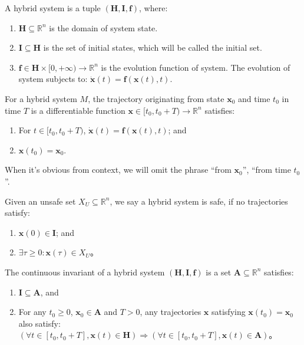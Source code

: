 \documentclass{jssc}
\begin{document}
\begin{definition}
A hybrid system is a tuple $(\boldsymbol{H}, \boldsymbol{I}, \boldsymbol{f})$,  where:
	\begin{enumerate}
		\item $\boldsymbol{H} \subseteq \mathbb{R}^n$  is the domain of system state.
		\item $\boldsymbol{I} \subseteq \boldsymbol{H}$ is the set of initial states, which will be called the initial set.
		\item $\boldsymbol{f} \in \boldsymbol{H} \times [0, +\infty) \rightarrow \mathbb{R}^n$ is the evolution function of system. The evolution of system subjects to: $\dot{\boldsymbol{x}}(t) = \boldsymbol{f}(\boldsymbol{x}(t),t)$.
	\end{enumerate}
\end{definition}

\begin{definition}[Trajectory]
For a hybrid system $M$, the trajectory originating from state $\boldsymbol{x}_0$ and time $t_0$ in time $T$ is a differentiable function $\boldsymbol{x} \in [t_0, t_0 + T) \rightarrow \mathbb{R}^n$ satisfies:
	\begin{enumerate}
		\item For $t \in [t_0, t_0 + T)$, $\dot{\boldsymbol{x}}(t) = \boldsymbol{f}(\boldsymbol{x}(t),t)$; and
		\item $\boldsymbol{x}(t_0) = \boldsymbol{x}_0$.
	\end{enumerate}
	
When it's obvious from context, we will omit the phrase ``from $\boldsymbol{x}_0$'', ``from time $t_0$''.
\end{definition}

\begin{definition}[Safety]
Given an unsafe set $X_U \subseteq \mathbb{R}^n$,  we say a hybrid system is safe, if no trajectories satisfy:
	\begin{enumerate}
		\item $\boldsymbol{x}(0) \in \boldsymbol{I}$; and
		\item $\exists \tau \geq 0 : \boldsymbol{x}(\tau) \in X_U$。
	\end{enumerate}
\end{definition}

\begin{definition}
\label{def:invariant}
The continuous invariant of a hybrid system $(\boldsymbol{H}, \boldsymbol{I}, \boldsymbol{f})$ is a set $\boldsymbol{A} \subseteq \mathbb{R}^n$ satisfies:
	\begin{enumerate}
		\item $\boldsymbol{I} \subseteq \boldsymbol{A}$, and
		\item For any $t_0 \geq 0$, $\boldsymbol{x}_0 \in \boldsymbol{A}$ and $T > 0$, any trajectories $\boldsymbol{x}$ satisfying $\boldsymbol{x}(t_0) = \boldsymbol{x}_0$ also satisfy: $(\forall t \in [t_0, t_0 + T],\boldsymbol{x}(t) \in \boldsymbol{H}) \Rightarrow (\forall t \in [t_0,t_0 + T], \boldsymbol{x}(t) \in \boldsymbol{A})$。
	\end{enumerate}
\end{definition}
\end{document}
